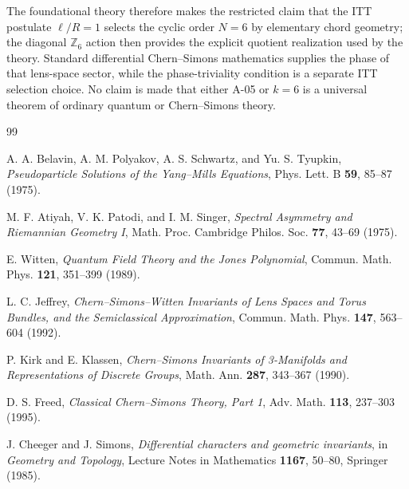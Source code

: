 \documentclass[11pt,a4paper]{article}
\begin{document}
The foundational theory therefore makes the restricted claim that the ITT postulate $\ell/R=1$ selects the cyclic order $N=6$ by elementary chord geometry; the diagonal $\mathbb Z_6$ action then provides the explicit quotient realization used by the theory. Standard differential Chern--Simons mathematics supplies the phase of that lens-space sector, while the phase-triviality condition is a separate ITT selection choice. No claim is made that either A-05 or $k=6$ is a universal theorem of ordinary quantum or Chern--Simons theory.

\begin{thebibliography}{99}

A. A. Belavin, A. M. Polyakov, A. S. Schwartz, and Yu. S. Tyupkin,
\textit{Pseudoparticle Solutions of the Yang--Mills Equations},
Phys. Lett. B \textbf{59}, 85--87 (1975).

M. F. Atiyah, V. K. Patodi, and I. M. Singer,
\textit{Spectral Asymmetry and Riemannian Geometry I},
Math. Proc. Cambridge Philos. Soc. \textbf{77}, 43--69 (1975).

E. Witten,
\textit{Quantum Field Theory and the Jones Polynomial},
Commun. Math. Phys. \textbf{121}, 351--399 (1989).

L. C. Jeffrey,
\textit{Chern--Simons--Witten Invariants of Lens Spaces and Torus Bundles, and the Semiclassical Approximation},
Commun. Math. Phys. \textbf{147}, 563--604 (1992).

P. Kirk and E. Klassen,
\textit{Chern--Simons Invariants of 3-Manifolds and Representations of Discrete Groups},
Math. Ann. \textbf{287}, 343--367 (1990).

D. S. Freed,
\textit{Classical Chern--Simons Theory, Part 1},
Adv. Math. \textbf{113}, 237--303 (1995).

J. Cheeger and J. Simons,
\textit{Differential characters and geometric invariants},
in \textit{Geometry and Topology}, Lecture Notes in Mathematics \textbf{1167}, 50--80,
Springer (1985).

\end{thebibliography}
\end{document}
